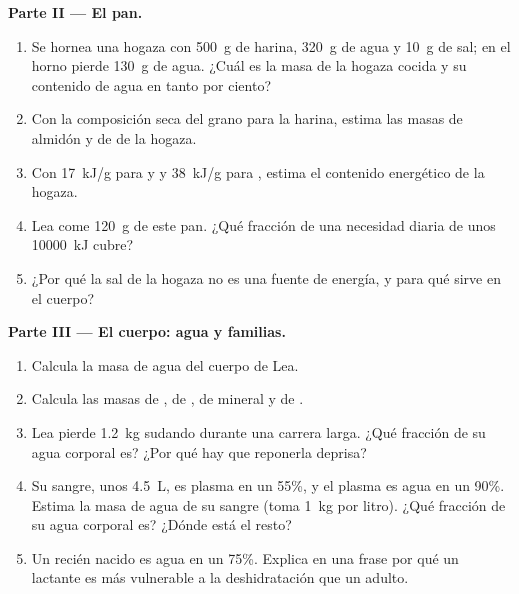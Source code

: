 \begin{problem}
\medskip
\noindent\textbf{Parte II --- El pan.}
\begin{enumerate}[resume]
  \item Se hornea una hogaza con \qty{500}{g} de harina, \qty{320}{g}
        de agua y \qty{10}{g} de sal; en el horno pierde \qty{130}{g}
        de agua. ¿Cuál es la masa de la hogaza cocida y su contenido de
        agua en tanto por ciento?
  \item Con la composición seca del grano para la harina, estima las
        masas de almidón y de  de la hogaza.
  \item Con \qty{17}{kJ/g} para  y  y \qty{38}{kJ/g}
        para , estima el contenido energético de la hogaza.
  \item Lea come \qty{120}{g} de este pan. ¿Qué fracción de una
        necesidad diaria de unos \qty{10000}{kJ} cubre?
  \item ¿Por qué la sal de la hogaza no es una fuente de energía, y
        para qué sirve en el cuerpo?
\end{enumerate}

\medskip
\noindent\textbf{Parte III --- El cuerpo: agua y familias.}
\begin{enumerate}[resume]
  \item Calcula la masa de agua del cuerpo de Lea.
  \item Calcula las masas de , de , de mineral y de .
  \item Lea pierde \qty{1.2}{kg} sudando durante una carrera larga.
        ¿Qué fracción de su agua corporal es? ¿Por qué hay que
        reponerla deprisa?
  \item Su sangre, unos \qty{4.5}{L}, es plasma en un 55\%, y el plasma
        es agua en un 90\%. Estima la masa de agua de su sangre (toma
        \qty{1}{kg} por litro). ¿Qué fracción de su agua corporal es?
        ¿Dónde está el resto?
  \item Un recién nacido es agua en un 75\%. Explica en una frase por
        qué un lactante es más vulnerable a la deshidratación que un
        adulto.
\end{enumerate}


\end{problem}
